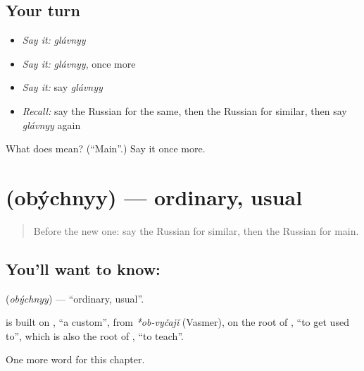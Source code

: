\subsection*{Your turn}
\begin{itemize}
\raggedright
  \item \emph{Say it:} \emph{glávnyy}
  \item \emph{Say it:} \emph{glávnyy}, once more
  \item \emph{Say it:} say \emph{glávnyy}
  \item \emph{Recall:} say the Russian for the same, then the Russian for similar, then say \emph{glávnyy} again
\end{itemize}

\begin{tcolorbox}[breakable,colback=teal!4,colframe=teal!35!black,title={Before you move on}]
What does  mean? (\textquotedblleft{}Main\textquotedblright{}.) Say it once more.
\end{tcolorbox}
\section[\texorpdfstring{\ru{обычный} (obýchnyy)}{обычный (obýchnyy)}]{ (obýchnyy) — ordinary, usual}

\label{lesson:RU-C218-obychnyy}



\begin{quote}
Before the new one: say the Russian for similar, then the Russian for main.
\end{quote}

\subsection*{You'll want to know: }
\textbf{} (\emph{obýchnyy}) — \textquotedblleft{}ordinary, usual\textquotedblright{}.

\begin{cousinweb}
\textbf{} is built on \emph{}, \textquotedblleft{}a custom\textquotedblright{}, from \emph{*ob-vyčajĭ} (Vasmer), on the root of \emph{}, \textquotedblleft{}to get used to\textquotedblright{}, which is also the root of \emph{}, \textquotedblleft{}to teach\textquotedblright{}.
\end{cousinweb}

\begin{grammarlens}[title={What you've built}]
One more word for this chapter.
\end{grammarlens}

